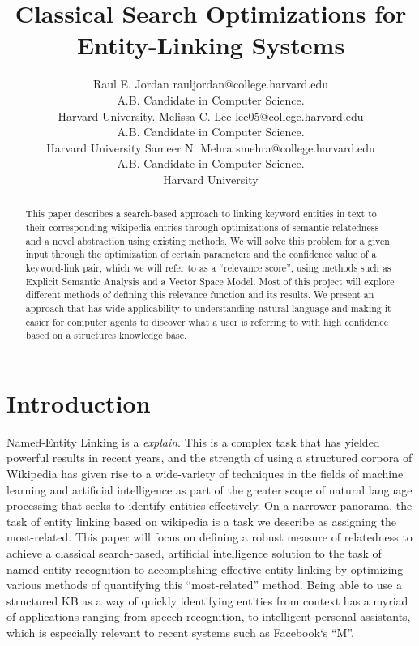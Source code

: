 \documentclass[twoside,11pt]{article}
\begin{document}
\title{Classical Search Optimizations for Entity-Linking Systems}

\author{\name Raul E. Jordan \email rauljordan@college.harvard.edu \\
       \addr A.B. Candidate in Computer Science. \\ Harvard University.
       \AND
       \name Melissa C. Lee \email lee05@college.harvard.edu \\
       \addr A.B. Candidate in Computer Science. \\
       Harvard University
       \AND
       \name Sameer N. Mehra \email smehra@college.harvard.edu \\
       \addr A.B. Candidate in Computer Science. \\
       Harvard University}



\maketitle


\begin{abstract}
This paper describes a search-based approach to linking keyword entities in text to their corresponding wikipedia entries through optimizations of semantic-relatedness and a novel abstraction using existing methods. We will solve this problem for a given input through the optimization of certain parameters and the confidence value of a keyword-link pair, which we will refer to as a ``relevance score'', using methods such as Explicit Semantic Analysis and a Vector Space Model. Most of this project will explore different methods of defining this relevance function and its results. We present an approach that has wide applicability to understanding natural language and making it easier for computer agents to discover what a user is referring to with high confidence based on a structures knowledge base.
\end{abstract}


\section{Introduction}

Named-Entity Linking is a \textit{explain}. This is a complex task that has yielded powerful results in recent years, and the strength of using a structured corpora of Wikipedia has given rise to a wide-variety of techniques in the fields of machine learning and artificial intelligence as part of the greater scope of natural language processing that seeks to identify entities effectively. On a narrower panorama, the task of entity linking based on wikipedia is a task we describe as assigning the most-related. This paper will focus on defining a robust measure of relatedness to achieve a classical search-based, artificial intelligence solution to the task of named-entity recognition  to accomplishing effective entity linking by optimizing various methods of quantifying this “most-related” method. Being able to use a structured KB as a way of quickly identifying entities from context has a myriad of applications ranging from speech recognition, to intelligent personal assistants, which is especially relevant to recent systems such as Facebook`s ``M''.
\end{document}
